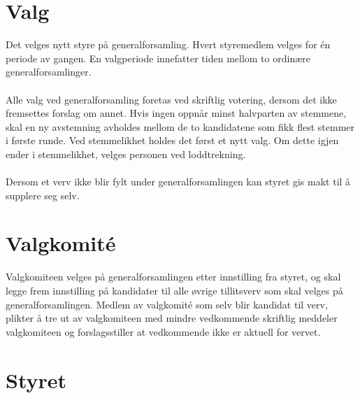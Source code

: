 \documentclass[12pt,a4paper,norsk]{article}
\begin{document}
\section{Valg}

Det velges nytt styre på generalforsamling. Hvert styremedlem velges for én periode av gangen.
En valgperiode innefatter tiden mellom to ordinære generalforsamlinger.
\\
\\
Alle valg ved generalforsamling foretas ved skriftlig votering, dersom det ikke fremsettes forslag
om annet. Hvis ingen oppnår minst halvparten av stemmene, skal en ny avstemning avholdes
mellom de to kandidatene som fikk flest stemmer i første runde. Ved stemmelikhet holdes det
først et nytt valg. Om dette igjen ender i stemmelikhet, velges personen ved loddtrekning.
\\
\\
Dersom et verv ikke blir fylt under generalforsamlingen kan styret gis makt til å supplere seg
selv.



\section{Valgkomité}

Valgkomiteen velges på generalforsamlingen etter innstilling fra styret, og skal
legge frem innstilling på kandidater til alle øvrige tillitsverv som skal velges på
generalforsamlingen. Medlem av valgkomité som selv blir kandidat til verv,
plikter å tre ut av valgkomiteen med mindre vedkommende skriftlig meddeler
valgkomiteen og forslagsstiller at vedkommende ikke er aktuell for vervet.



\section{Styret}
\end{document}
